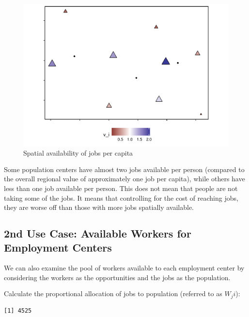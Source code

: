 \documentclass[]{elsarticle} %
\begin{document}
\begin{figure}
\includegraphics[width=1\linewidth]{Spatial-Availability_files/figure-latex/toy-example-availability-jobs-per-capita-1} \caption{\label{fig:toy-example-availability-jobs-per-capita}Spatial availability of jobs per capita}\label{fig:toy-example-availability-jobs-per-capita}
\end{figure}

Some population centers have almost two jobs available per person
(compared to the overall regional value of approximately one job per
capita), while others have less than one job available per person. This
does not mean that people are not taking some of the jobs. It means that
controlling for the cost of reaching jobs, they are worse off than those
with more jobs spatially available.

\hypertarget{nd-use-case-available-workers-for-employment-centers}{%
\subsection{2nd Use Case: Available Workers for Employment
Centers}\label{nd-use-case-available-workers-for-employment-centers}}

We can also examine the pool of workers available to each employment
center by considering the workers as the opportunities and the jobs as
the population.

Calculate the proportional allocation of jobs to population (referred to
as \(W_ji\)):

\begin{verbatim}
[1] 4525
\end{verbatim}
\end{document}
